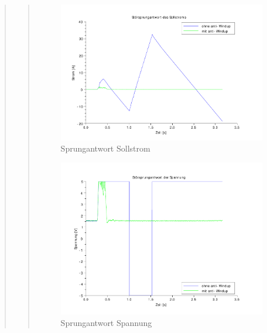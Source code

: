 \begin{quote}
\begin{quote}
        \begin{figure}[H]
        \centering
            \includegraphics[scale=0.8, trim = 0.5cm 0.5cm 2cm 0.5cm,
            clip]{./Bilder/windup_sprungantwort_sollstrom}    
            \caption{Sprungantwort Sollstrom}
        \end{figure}
        
        \begin{figure}[H]
        \centering
            \includegraphics[scale=0.8, trim = 0.5cm 0.5cm 2cm 0.5cm,
            clip]{./Bilder/windup_sprungantwort_Spannung}    
            \caption{Sprungantwort Spannung}
        \end{figure}        
        


\end{quote}
\end{quote}
